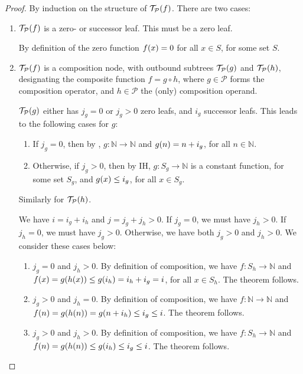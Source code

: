 \begin{proof} By induction on the structure of $\mathcal{T}_\mathcal{P}{\mathopen{}\left({f}\right)\mathclose{}}$.
There are two cases:\begin{enumerate}[label=(\arabic*)]

\item $\mathcal{T}_\mathcal{P}{\mathopen{}\left({f}\right)\mathclose{}}$ is a zero- or successor leaf. This must be
a zero leaf.

By definition of the zero function $f{\mathopen{}\left({x}\right)\mathclose{}} = 0$ for all $x \in S$, for some set
$S$.

\item $\mathcal{T}_\mathcal{P}{\mathopen{}\left({f}\right)\mathclose{}}$ is a composition node, with outbound
subtrees $\mathcal{T}_\mathcal{P}{\mathopen{}\left({g}\right)\mathclose{}}$ and $\mathcal{T}_\mathcal{P}{\mathopen{}\left({h}\right)\mathclose{}}$,
designating the composite function $f = g \circ h$, where $g \in \mathcal{P}$
forms the composition operator, and $h \in \mathcal{P}$ the (only) composition
operand.

$\mathcal{T}_\mathcal{P}{\mathopen{}\left({g}\right)\mathclose{}}$ either has $j_g=0$ or $j_g>0$ zero leafs, and
$i_g$ successor leafs. This leads to the following cases for $g$:

\begin{enumerate}[label=(\roman*)]

\item If $j_g=0$, then by , $g : \mathbb{N} \rightarrow
\mathbb{N}$ and $g{\mathopen{}\left({n}\right)\mathclose{}} = n + i_g$, for all $n \in \mathbb{N}$.

\item Otherwise, if $j_g > 0$, then by IH, $g : S_g \rightarrow \mathbb{N}$ is
a constant function, for some set $S_g$, and $g{\mathopen{}\left({x}\right)\mathclose{}} \leq i_g$, for all $x \in
S_g$.

\end{enumerate}

Similarly for $\mathcal{T}_\mathcal{P}{\mathopen{}\left({h}\right)\mathclose{}}$.

We have $i = i_g + i_h$ and $j = j_g + j_h > 0$. If $j_g = 0$, we must have
$j_h > 0$. If $j_h = 0$, we must have $j_g > 0$. Otherwise, we have both $j_g >
0$ and $j_h > 0$. We consider these cases below:

\begin{enumerate}[label=(\roman*)]

\item $j_g = 0$ and $j_h > 0$. By definition of composition, we have $f : S_h
\rightarrow \mathbb{N}$ and $f{\mathopen{}\left({x}\right)\mathclose{}} = g{\mathopen{}\left({h{\mathopen{}\left({x}\right)\mathclose{}}}\right)\mathclose{}} \leq g{\mathopen{}\left({i_h}\right)\mathclose{}} = i_h + i_g =
i$, for all $x \in S_h$. The theorem follows.

\item $j_g > 0$ and $j_h = 0$. By definition of composition, we have $f :
\mathbb{N} \rightarrow \mathbb{N}$ and $f{\mathopen{}\left({n}\right)\mathclose{}} = g{\mathopen{}\left({h{\mathopen{}\left({n}\right)\mathclose{}}}\right)\mathclose{}} = g{\mathopen{}\left({n + i_h}\right)\mathclose{}}
\leq i_g \leq i$. The theorem follows.

\item $j_g > 0$ and $j_h > 0$. By definition of composition, we have $f : S_h
\rightarrow \mathbb{N}$ and $f{\mathopen{}\left({n}\right)\mathclose{}} = g{\mathopen{}\left({h{\mathopen{}\left({n}\right)\mathclose{}}}\right)\mathclose{}} \leq g{\mathopen{}\left({i_h}\right)\mathclose{}} \leq i_g \leq
i$. The theorem follows.

\end{enumerate}

\end{enumerate}\end{proof}

